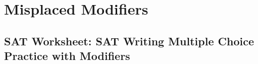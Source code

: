 \section{Misplaced Modifiers}
\subsection{SAT Worksheet: SAT Writing Multiple Choice Practice with Modifiers}